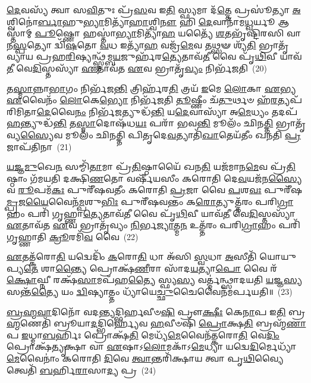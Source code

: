 \-\ul{𑌦𑍇}\-𑌵𑌸𑍍𑌯᳴ 𑌤𑍍𑌵𑌾 𑌸\-\ul{𑌵𑌿}\-𑌤𑍁𑌃 𑌪𑍍𑌰᳴\-\ul{𑌸}\-𑌵 𑌇\-\ul{𑌤𑌿} 𑌸𑍍𑌫𑍍𑌯𑌮𑌾 𑌦᳴\-\ul{𑌤𑍍𑌤𑍇} 𑌪𑍍𑌰𑌸𑍂॑𑌤𑍍𑌯𑌾 \ul{𑌅}\-𑌶𑍍𑌵𑌿𑌨𑍋॑\-\ul{𑌰𑍍𑌬𑌾}\-𑌹𑍁\-\ul{𑌭𑍍𑌯𑌾}\-𑌮𑌿𑌤𑍍𑌯𑌾᳴\-\ul{𑌹𑌾}\-𑌶𑍍𑌵𑌿\-\ul{𑌨𑍗} 𑌹𑌿 \ul{𑌦𑍇}\-𑌵𑌾𑌨𑌾᳴𑌮\-\ul{𑌧𑍍𑌵}\-𑌰𑍍𑌯𑍂 𑌆𑌸𑍍𑌤𑌾॑𑌮𑍍 \ul{𑌪𑍂}\-𑌷𑍍𑌣𑍋 𑌹𑌸𑍍𑌤𑌾॑\-\ul{𑌭𑍍𑌯𑌾}\-𑌮𑌿𑌤𑍍𑌯𑌾᳴\-\ul{𑌹} 𑌯𑌤𑍍𑌯𑍈᳴ \ul{𑌶}\-𑌤𑌭𑍃᳴𑌷𑍍𑌟𑌿𑌰𑌸𑌿 𑌵𑌾𑌨\-\ul{𑌸𑍍𑌪}\-𑌤𑍍𑌯𑍋 𑌦𑍍𑌵𑌿᳴\-\ul{𑌷}\-𑌤𑍋 \ul{𑌵}\-𑌧 𑌇𑌤𑍍𑌯𑌾᳴\-\ul{𑌹} 𑌵𑌜𑍍𑌰᳴\-\ul{𑌮𑍇}\-𑌵 𑌤𑌥𑍍𑌸𑍟 𑌶𑍍𑌯᳴\-\ul{𑌤𑌿} 𑌭𑍍𑌰𑌾𑌤𑍃᳴𑌵𑍍𑌯𑌾𑌯 𑌪𑍍𑌰𑌹\-\ul{𑌰𑌿}\-𑌷𑍍𑌯𑌨𑍍𑌥𑍍𑌸𑍍𑌤᳴𑌮𑍍𑌬\-\ul{𑌯}\-𑌜𑍁𑌰𑍍\mbox{}𑌹᳴𑌰\-\ul{𑌤𑍍𑌯𑍇}\-𑌤𑌾𑌵᳴\-\ul{𑌤𑍀} 𑌵𑍈 𑌪𑍃᳴\-\ul{𑌥𑌿}\-𑌵𑍀 𑌯𑌾𑌵᳴\-\ul{𑌤𑍀} 𑌵𑍇\-\ul{𑌦𑌿}\-𑌸𑍍𑌤𑌸𑍍𑌯𑌾᳴ \ul{𑌏}\-𑌤𑌾𑌵᳴𑌤 \ul{𑌏}\-𑌵 𑌭𑍍𑌰𑌾𑌤𑍃᳴\-\ul{𑌵𑍍𑌯𑌂} 𑌨𑌿𑌰𑍍𑌭᳴𑌜𑌤𑌿~(20)

𑌤\-\ul{𑌸𑍍𑌮𑌾}\-𑌨𑍍𑌨𑌾\-\ul{𑌭𑌾}\-𑌗𑌂 𑌨𑌿𑌰𑍍𑌭᳴𑌜\-\ul{𑌨𑍍𑌤𑌿} 𑌤𑍍𑌰𑌿𑌰𑍍\mbox{}𑌹᳴𑌰\-\ul{𑌤𑌿} 𑌤𑍍𑌰𑌯᳴ \ul{𑌇}\-𑌮𑍇 \ul{𑌲𑍋}\-𑌕𑌾 \ul{𑌏}\-𑌭𑍍𑌯 \ul{𑌏}\-𑌵𑍈𑌨𑌂᳴ \ul{𑌲𑍋}\-𑌕𑍇\-\ul{𑌭𑍍𑌯𑍋} 𑌨𑌿𑌰𑍍𑌭᳴𑌜𑌤𑌿 \ul{𑌤𑍂}\-𑌷𑍍𑌣𑍀𑌂 𑌚᳴\-\ul{𑌤𑍁}\-𑌰𑍍𑌥𑍞 𑌹᳴\-\ul{𑌰}\-𑌤𑍍𑌯𑌪᳴𑌰𑌿𑌮𑌿𑌤𑌾\-\ul{𑌦𑍇}\-𑌵𑍈\-\ul{𑌨𑌂} 𑌨𑌿𑌰𑍍𑌭᳴\-\ul{𑌜}\-𑌤𑍍𑌯𑍁𑌦𑍍𑌧᳴\-\ul{𑌨𑍍𑌤𑌿} 𑌯\-\ul{𑌦𑍇}\-𑌵𑌾𑌸𑍍𑌯𑌾᳴ 𑌅\-\ul{𑌮𑍇}\-𑌧𑍍𑌯𑌂 𑌤𑌦𑌪᳴ \ul{𑌹}\-𑌨𑍍𑌤𑍍𑌯𑍁𑌦𑍍𑌧᳴\-\ul{𑌨𑍍𑌤𑌿} 𑌤\-\ul{𑌸𑍍𑌮𑌾}\-𑌦𑍋𑌷᳴𑌧\-\ul{𑌯𑌃} 𑌪𑌰𑌾᳴ 𑌭𑌵\-\ul{𑌨𑍍𑌤𑌿} 𑌮𑍂𑌲𑌂᳴ 𑌛𑌿𑌨\-\ul{𑌤𑍍𑌤𑌿} 𑌭𑍍𑌰𑌾𑌤𑍃᳴𑌵𑍍𑌯\-\ul{𑌸𑍍𑌯𑍈}\-𑌵 𑌮𑍂𑌲𑌂᳴ 𑌛𑌿𑌨𑌤𑍍𑌤𑌿 𑌪𑌿𑌤𑍃𑌦𑍇\-\ul{𑌵}\-𑌤𑍍𑌯𑌾𑌤𑌿᳴\-\ul{𑌖𑌾}\-𑌤𑍇𑌯᳴𑌤𑍀𑌂 𑌖𑌨𑌤𑌿 \ul{𑌪𑍍𑌰}\-𑌜𑌾𑌪᳴𑌤𑌿𑌨𑌾~(21)

\-\ul{𑌯}\-\-\ul{𑌜𑍍𑌞}\-\-\ul{𑌮𑍁}\-𑌖𑍇\-\ul{𑌨} 𑌸𑌮𑍍𑌮𑌿᳴\-\ul{𑌤𑌾}\-𑌮𑌾 𑌪𑍍𑌰᳴\-\ul{𑌤𑌿}\-𑌷𑍍𑌠𑌾𑌯𑍈᳴ 𑌖𑌨\-\ul{𑌤𑌿} 𑌯𑌜᳴𑌮𑌾𑌨\-\ul{𑌮𑍇}\-𑌵 𑌪𑍍𑌰᳴\-\ul{𑌤𑌿}\-𑌷𑍍𑌠𑌾𑌂 𑌗᳴𑌮𑌯𑌤𑌿 𑌦𑌕𑍍𑌷𑌿\-\ul{𑌣}\-𑌤𑍋 𑌵𑌰𑍍\mbox{}𑌷𑍀᳴𑌯𑌸𑍀𑌂 𑌕𑌰𑍋𑌤𑌿 𑌦𑍇\-\ul{𑌵}\-𑌯𑌜᳴𑌨\-\ul{𑌸𑍍𑌯𑍈}\-𑌵 \ul{𑌰𑍂}\-𑌪𑌮᳴\-\ul{𑌕𑌃} 𑌪𑍁𑌰𑍀᳴𑌷𑌵𑌤𑍀𑌂 𑌕𑌰𑍋𑌤𑌿 \ul{𑌪𑍍𑌰}\-𑌜𑌾 𑌵𑍈 \ul{𑌪}\-𑌶\-\ul{𑌵𑌃} 𑌪𑍁𑌰𑍀᳴𑌷\-\ul{𑌮𑍍𑌪𑍍𑌰}\-𑌜\-\ul{𑌯𑍈}\-𑌵𑍈𑌨᳴\-\ul{𑌮𑍍𑌪}\-𑌶𑍁\-\ul{𑌭𑌿𑌃} 𑌪𑍁𑌰𑍀᳴𑌷𑌵𑌨𑍍𑌤𑌂 𑌕\-\ul{𑌰𑍋}\-𑌤𑍍𑌯𑍁𑌤𑍍𑌤᳴𑌰𑌂 𑌪𑌰𑌿\-\ul{𑌗𑍍𑌰𑌾}\-𑌹𑌂 𑌪𑌰𑌿᳴ 𑌗𑍃𑌹𑍍𑌣𑌾\-\ul{𑌤𑍍𑌯𑍇}\-𑌤𑌾𑌵᳴\-\ul{𑌤𑍀} 𑌵𑍈 𑌪𑍃᳴\-\ul{𑌥𑌿}\-𑌵𑍀 𑌯𑌾𑌵᳴\-\ul{𑌤𑍀} 𑌵𑍇\-\ul{𑌦𑌿}\-𑌸𑍍𑌤𑌸𑍍𑌯𑌾᳴ \ul{𑌏}\-𑌤𑌾𑌵᳴𑌤 \ul{𑌏}\-𑌵 𑌭𑍍𑌰𑌾𑌤𑍃᳴𑌵𑍍𑌯𑌂 \ul{𑌨𑌿}\-𑌰𑍍𑌭\-\ul{𑌜𑍍𑌯𑌾}\-𑌤𑍍𑌮\-\ul{𑌨} 𑌉𑌤𑍍𑌤᳴𑌰𑌂 𑌪𑌰𑌿\-\ul{𑌗𑍍𑌰𑌾}\-𑌹𑌂 𑌪𑌰𑌿᳴ 𑌗𑍃𑌹𑍍𑌣𑌾𑌤𑌿 \ul{𑌕𑍍𑌰𑍂}\-𑌰𑌮𑌿᳴\-\ul{𑌵} 𑌵𑍈~(22)

\-\ul{𑌏}\-𑌤𑌤𑍍𑌕᳴𑌰𑍋\-\ul{𑌤𑌿} 𑌯𑌦𑍍𑌵𑍇𑌦𑌿𑌂᳴ \ul{𑌕}\-𑌰𑍋\-\ul{𑌤𑌿} 𑌧𑌾 𑌅᳴𑌸𑌿 \ul{𑌸𑍍𑌵}\-𑌧𑌾 \ul{𑌅}\-𑌸𑍀𑌤𑌿᳴ 𑌯𑍋𑌯𑍁𑌪𑍍𑌯\-\ul{𑌤𑍇} 𑌶𑌾\-\ul{𑌨𑍍𑌤𑍍𑌯𑍈} 𑌪𑍍𑌰𑍋𑌕𑍍𑌷᳴\-\ul{𑌣𑍀}\-𑌰𑌾 𑌸𑌾᳴𑌦\-\ul{𑌯}\-𑌤𑍍𑌯𑌾\-\ul{𑌪𑍋} 𑌵𑍈 𑌰᳴\-\ul{𑌕𑍍𑌷𑍋}\-𑌘𑍍𑌨𑍀 𑌰𑌕𑍍𑌷᳴\-\ul{𑌸𑌾}\-𑌮𑌪᳴𑌹\-\ul{𑌤𑍍𑌯𑍈} 𑌸𑍍𑌫𑍍𑌯\-\ul{𑌸𑍍𑌯} 𑌵𑌰𑍍𑌤𑍍𑌮॑𑌨𑍍𑌥𑍍𑌸𑌾𑌦𑌯𑌤𑌿 \ul{𑌯}\-𑌜𑍍𑌞\-\ul{𑌸𑍍𑌯} 𑌸𑌨𑍍𑌤᳴\-\ul{𑌤𑍍𑌯𑍈} 𑌯𑌂 \ul{𑌦𑍍𑌵𑌿}\-𑌷𑍍𑌯𑌾𑌤𑍍𑌤𑌂 𑌧𑍍𑌯𑌾᳴𑌯𑍇\-\ul{𑌚𑍍𑌛𑍁}\-𑌚𑍈𑌵𑍈𑌨᳴𑌮𑌰𑍍𑌪𑌯𑌤𑌿॥~(23)

{\anuvakamend[{\-\ul{𑌭}\-\-\ul{𑌜}\-\-\ul{𑌤𑌿} \ul{𑌪𑍍𑌰}\-𑌜𑌾𑌪᳴𑌤𑌿𑌨𑍇\-\ul{𑌵} 𑌵𑍈 𑌤𑍍𑌰𑌯᳴𑌸𑍍𑌤𑍍𑌰𑌿𑍞𑌶𑌚𑍍𑌚}]}%

\-\ul{𑌬𑍍𑌰}\-\-\ul{𑌹𑍍𑌮}\-\-\ul{𑌵𑌾}\-𑌦𑌿𑌨𑍋᳴ 𑌵𑌦\-\ul{𑌨𑍍𑌤𑍍𑌯}\-𑌦𑍍𑌭𑌿𑌰𑍍\mbox{}\-\ul{𑌹}\-𑌵𑍀𑍞\-\ul{𑌷𑌿} 𑌪𑍍𑌰𑍗\-\ul{𑌕𑍍𑌷𑍀𑌃} 𑌕𑍇\-\ul{𑌨𑌾}\-𑌪 𑌇\-\ul{𑌤𑌿} 𑌬𑍍𑌰\-\ul{𑌹𑍍𑌮}\-𑌣𑍇𑌤𑌿᳴ 𑌬𑍍𑌰𑍂𑌯𑌾\-\ul{𑌦}\-𑌦𑍍𑌭𑌿𑌰𑍍\mbox{}𑌹𑍍𑌯𑍇᳴𑌵 \ul{𑌹}\-𑌵𑍀𑍞𑌷𑌿᳴ \ul{𑌪𑍍𑌰𑍋}\-𑌕𑍍𑌷\-\ul{𑌤𑌿} 𑌬𑍍𑌰𑌹𑍍𑌮᳴\-\ul{𑌣𑌾}\-𑌪 \ul{𑌇}\-𑌧𑍍𑌮𑌾\-\ul{𑌬}\-𑌰𑍍\mbox{}𑌹𑌿𑌃 𑌪𑍍𑌰𑍋𑌕𑍍𑌷᳴\-\ul{𑌤𑌿} 𑌮𑍇𑌧𑍍𑌯᳴\-\ul{𑌮𑍇}\-𑌵𑍈𑌨᳴𑌤𑍍𑌕𑌰𑍋\-\ul{𑌤𑌿} 𑌵𑍇\-\ul{𑌦𑌿𑌂} 𑌪𑍍𑌰𑍋𑌕𑍍𑌷᳴\-\ul{𑌤𑍍𑌯𑍃}\-𑌕𑍍𑌷𑌾 𑌵𑌾 \ul{𑌏}\-𑌷𑌾\-𑌽\-\ul{𑌲𑍋}\-𑌮𑌕𑌾᳴\-𑌽\-\ul{𑌮𑍇}\-𑌧𑍍𑌯𑌾 𑌯𑌦𑍍𑌵𑍇\-\ul{𑌦𑌿}\-𑌰𑍍𑌮𑍇𑌧𑍍𑌯𑌾᳴\-\ul{𑌮𑍇}\-𑌵𑍈𑌨𑌾𑌂॑ 𑌕𑌰𑍋𑌤𑌿 \ul{𑌦𑌿}\-𑌵𑍇 \ul{𑌤𑍍𑌵𑌾}\-𑌨𑍍𑌤𑌰𑌿᳴𑌕𑍍𑌷𑌾𑌯 𑌤𑍍𑌵𑌾 𑌪𑍃\-\ul{𑌥𑌿}\-𑌵𑍍𑌯𑍈 𑌤𑍍𑌵𑍇𑌤𑌿᳴ \ul{𑌬}\-𑌰𑍍\mbox{}𑌹𑌿\-\ul{𑌰𑌾}\-𑌸𑌾\-\ul{𑌦𑍍𑌯} 𑌪𑍍𑌰~(24)

